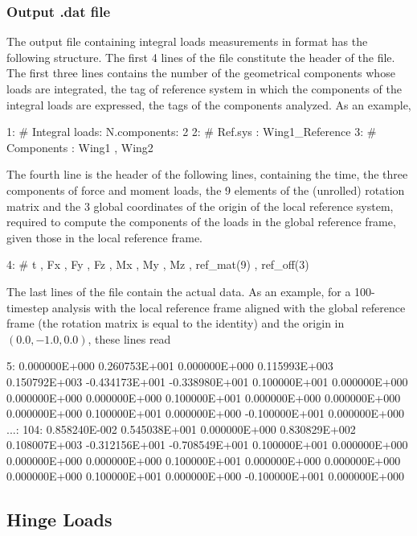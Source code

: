 \subsubsection{Output .dat file}
The output file containing integral loads measurements in  format has 
the following structure.
The first 4 lines of the file constitute the header of the file. The first three 
lines contains the number of the geometrical components  whose loads 
are integrated, the tag of reference system in which the components of the integral 
loads are expressed, the tags of the  components analyzed. As an example,
\begin{inputfile}
  1:  # Integral loads: N.components: 2
  2:  #                 Ref.sys     : Wing1_Reference
  3:  #                 Components  : Wing1 , Wing2
\end{inputfile}
The fourth line is the header of the following lines, containing the time, 
the three components of force and moment loads, the 9 elements of the (unrolled) 
rotation matrix and the 3 global coordinates of the origin of the local reference 
system, required to compute the components of the loads in the global reference 
frame, given those in the local reference frame.
\begin{inputfile}
  4:  #  t , Fx , Fy , Fz , Mx , My , Mz , ref_mat(9) , ref_off(3) 
\end{inputfile}
The last lines of the file contain the actual data. As an example, for a 
100-timestep analysis with the local reference frame  
aligned with the global reference frame (the rotation matrix is equal to the identity) 
and the origin in $(0.0,-1.0,0.0)$, these lines read
\begin{inputfile}
  5: 0.000000E+000  0.260753E+001  0.000000E+000  0.115993E+003
     0.150792E+003 -0.434173E+001 -0.338980E+001  0.100000E+001
     0.000000E+000  0.000000E+000  0.000000E+000  0.100000E+001
     0.000000E+000  0.000000E+000  0.000000E+000  0.100000E+001
     0.000000E+000 -0.100000E+001  0.000000E+000
...:
104: 0.858240E-002  0.545038E+001  0.000000E+000  0.830829E+002
     0.108007E+003 -0.312156E+001 -0.708549E+001  0.100000E+001
     0.000000E+000  0.000000E+000  0.000000E+000  0.100000E+001
     0.000000E+000  0.000000E+000  0.000000E+000  0.100000E+001
     0.000000E+000 -0.100000E+001  0.000000E+000
\end{inputfile}

\subsection{Hinge Loads}

